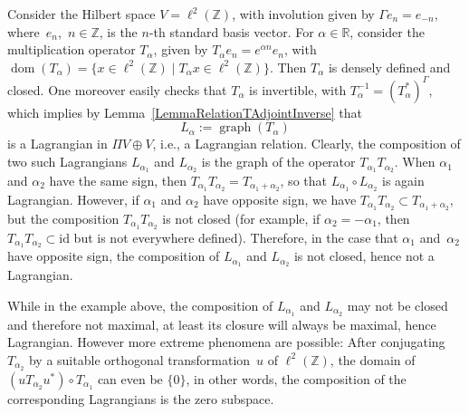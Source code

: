 \documentclass[pdftex]{sigma}
\numberwithin{equation}{section}
\DeclareMathOperator{\dom}{\mathrm{dom}}
\DeclareMathOperator{\graph}{\mathrm{graph}}
\newcommand{\R}{\mathbb{R}}
\newcommand{\Z}{\mathbb{Z}}
\begin{document}
\begin{Example} \label{ExampleNonComposable}
Consider the Hilbert space $V = \ell^2(\Z)$, with involution given by $\Gamma{e}_n = e_{-n}$, where~$e_n$,~$n \in \Z$, is the $n$-th standard basis vector.
For $\alpha \in \R$, consider the multiplication operator $T_\alpha$, given by $T_\alpha e_n = e^{\alpha n} e_n$, with $\dom(T_\alpha) = \big\{x \in \ell^2(\Z) \mid T_\alpha x \in \ell^2(\Z)\big\}$.
Then $T_\alpha$ is densely defined and closed.
One moreover easily checks that $T_\alpha$ is invertible, with $T^{-1}_\alpha =(T_\alpha^*)^\Gamma$, which implies by Lemma~\ref{LemmaRelationTAdjointInverse} that
\begin{equation*}
L_\alpha := \graph(T_\alpha)
\end{equation*}
is a Lagrangian in $\Pi V \oplus V$, i.e., a Lagrangian relation.
Clearly, the composition of two such Lagrangians $L_{\alpha_1}$ and $L_{\alpha_2}$ is the graph of the operator $T_{\alpha_1}T_{\alpha_2}$.
 When $\alpha_1$ and $\alpha_2$ have the same sign, then $T_{\alpha_1} T_{\alpha_2} = T_{\alpha_1+\alpha_2}$, so that $L_{\alpha_1} \circ L_{\alpha_2}$ is again Lagrangian.
 However, if $\alpha_1$ and $\alpha_2$ have opposite sign, we have $T_{\alpha_1}T_{\alpha_2} \subset T_{\alpha_1+\alpha_2}$, but the composition $T_{\alpha_1} T_{\alpha_2}$ is not closed (for example, if $\alpha_2 = - \alpha_1$, then $T_{\alpha_1} T_{\alpha_2} \subset \mathrm{id}$ but is not everywhere defined). Therefore, in the case that $\alpha_1$ and~$\alpha_2$ have opposite sign, the composition of $L_{\alpha_1}$ and $L_{\alpha_2}$ is not closed, hence not a Lagrangian.
 \end{Example}

 While in the example above, the composition of $L_{\alpha_1}$ and $L_{\alpha_2}$ may not be closed and therefore not maximal, at least its closure will always be maximal, hence Lagrangian.
 However more extreme phenomena are possible: After conjugating $T_{\alpha_2}$ by a suitable orthogonal transformation~$u$ of $\ell^2(\Z)$, the domain of $(u T_{\alpha_2}u^*) \circ T_{\alpha_1}$ can even be $\{0\}$, in other words, the composition of the corresponding Lagrangians is the zero subspace.
\end{document}
